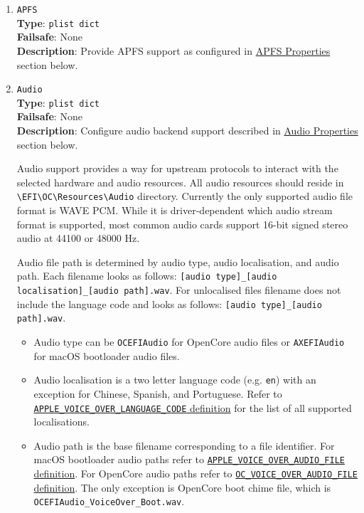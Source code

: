 \documentclass[]{article}
\providecommand{\tightlist}{%
  \setlength{\itemsep}{0pt}\setlength{\parskip}{0pt}}
\begin{document}
\begin{enumerate}
\item
  \texttt{APFS}\\
  \textbf{Type}: \texttt{plist\ dict}\\
  \textbf{Failsafe}: None\\
  \textbf{Description}: Provide APFS support as configured in
  \hyperref[uefiapfsprops]{APFS Properties} section below.

\item
  \texttt{Audio}\\
  \textbf{Type}: \texttt{plist\ dict}\\
  \textbf{Failsafe}: None\\
  \textbf{Description}: Configure audio backend support described
  in \hyperref[uefiaudioprops]{Audio Properties} section below.

  Audio support provides a way for upstream protocols to interact with the
  selected hardware and audio resources. All audio resources should reside
  in \texttt{\textbackslash EFI\textbackslash OC\textbackslash Resources\textbackslash Audio}
  directory. Currently the only supported audio file format is WAVE PCM. While it is
  driver-dependent which audio stream format is supported, most common audio cards
  support 16-bit signed stereo audio at 44100 or 48000 Hz.

  Audio file path is determined by audio type, audio localisation, and audio path. Each filename
  looks as follows: \texttt{[audio type]\_[audio localisation]\_[audio path].wav}. For unlocalised
  files filename does not include the language code and looks as follows:
  \texttt{[audio type]\_[audio path].wav}.

  \begin{itemize}
  \tightlist
  \item Audio type can be \texttt{OCEFIAudio} for OpenCore audio files or
    \texttt{AXEFIAudio} for macOS bootloader audio files.
  \item Audio localisation is a two letter language code (e.g. \texttt{en})
  with an exception for Chinese, Spanish, and Portuguese. Refer to
  \href{https://github.com/acidanthera/OpenCorePkg/blob/master/Include/Apple/Protocol/AppleVoiceOver.h}{\texttt{APPLE\_VOICE\_OVER\_LANGUAGE\_CODE} definition}
  for the list of all supported localisations.
  \item Audio path is the base filename corresponding to a file identifier. For macOS bootloader audio paths refer to
  \href{https://github.com/acidanthera/OpenCorePkg/blob/master/Include/Apple/Protocol/AppleVoiceOver.h}{\texttt{APPLE\_VOICE\_OVER\_AUDIO\_FILE} definition}.
  For OpenCore audio paths refer to
  \href{https://github.com/acidanthera/OpenCorePkg/blob/master/Include/Acidanthera/Protocol/OcAudio.h}{\texttt{OC\_VOICE\_OVER\_AUDIO\_FILE} definition}.
  The only exception is OpenCore boot chime file, which is \texttt{OCEFIAudio\_VoiceOver\_Boot.wav}.
  \end{itemize}


\end{enumerate}
\end{document}
